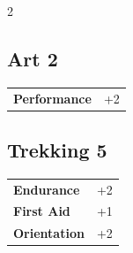 \begin{multicols}{2}
\begin{tcolorbox}

\end{tcolorbox}

\begin{tcolorbox}
    \subsection*{Art \hfill \small{2 }}
    \tcblower




\begin{tabular}{@{}ll@{}}
    \textbf{Performance} & +2\\
\end{tabular}


\end{tcolorbox}

\begin{tcolorbox}
    \subsection*{Trekking \hfill \small{5 }}
    \tcblower




\begin{tabular}{@{}ll@{}}
    \textbf{Endurance} & +2\\
    \textbf{First Aid} & +1\\
    \textbf{Orientation} & +2\\
\end{tabular}


\end{tcolorbox}

\begin{tcolorbox}

\end{tcolorbox}
\end{multicols}
